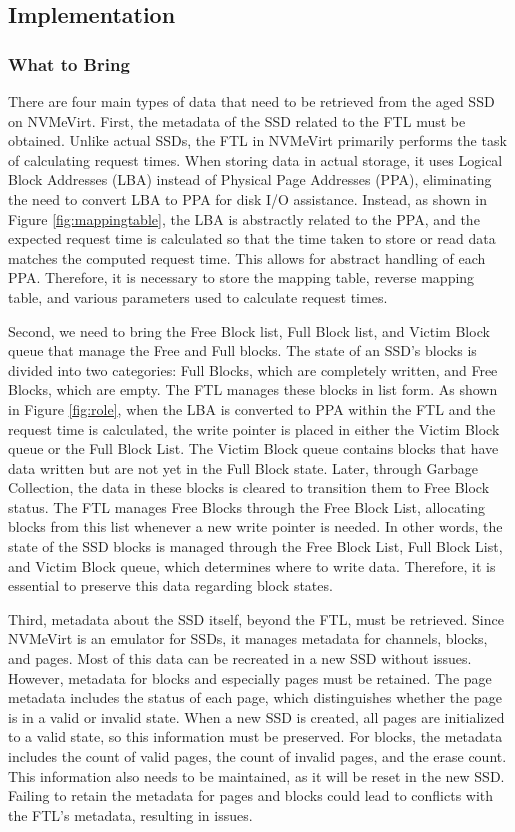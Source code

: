 \subsection{Implementation}
\subsubsection{What to Bring}
There are four main types of data that need to be retrieved from the aged SSD on NVMeVirt. 
First, the metadata of the SSD related to the FTL must be obtained. 
Unlike actual SSDs, the FTL in NVMeVirt primarily performs the task of calculating request times. 
When storing data in actual storage, it uses Logical Block Addresses (LBA) instead of Physical Page Addresses (PPA), eliminating the need to convert LBA to PPA for disk I/O assistance. 
Instead, as shown in Figure \ref{fig:mappingtable}, the LBA is abstractly related to the PPA, and the expected request time is calculated so that the time taken to store or read data matches the computed request time.
This allows for abstract handling of each PPA.
Therefore, it is necessary to store the mapping table, reverse mapping table, and various parameters used to calculate request times.

Second, we need to bring the Free Block list, Full Block list, and Victim Block queue that manage the Free and Full blocks. 
The state of an SSD's blocks is divided into two categories: Full Blocks, which are completely written, and Free Blocks, which are empty. 
The FTL manages these blocks in list form. 
As shown in Figure \ref{fig:role}, when the LBA is converted to PPA within the FTL and the request time is calculated, the write pointer is placed in either the Victim Block queue or the Full Block List.
The Victim Block queue contains blocks that have data written but are not yet in the Full Block state. 
Later, through Garbage Collection, the data in these blocks is cleared to transition them to Free Block status. 
The FTL manages Free Blocks through the Free Block List, allocating blocks from this list whenever a new write pointer is needed.
In other words, the state of the SSD blocks is managed through the Free Block List, Full Block List, and Victim Block queue, which determines where to write data. 
Therefore, it is essential to preserve this data regarding block states.

Third, metadata about the SSD itself, beyond the FTL, must be retrieved. 
Since NVMeVirt is an emulator for SSDs, it manages metadata for channels, blocks, and pages.
Most of this data can be recreated in a new SSD without issues. 
However, metadata for blocks and especially pages must be retained.
The page metadata includes the status of each page, which distinguishes whether the page is in a valid or invalid state. 
When a new SSD is created, all pages are initialized to a valid state, so this information must be preserved. 
For blocks, the metadata includes the count of valid pages, the count of invalid pages, and the erase count.
This information also needs to be maintained, as it will be reset in the new SSD.
Failing to retain the metadata for pages and blocks could lead to conflicts with the FTL's metadata, resulting in issues.

